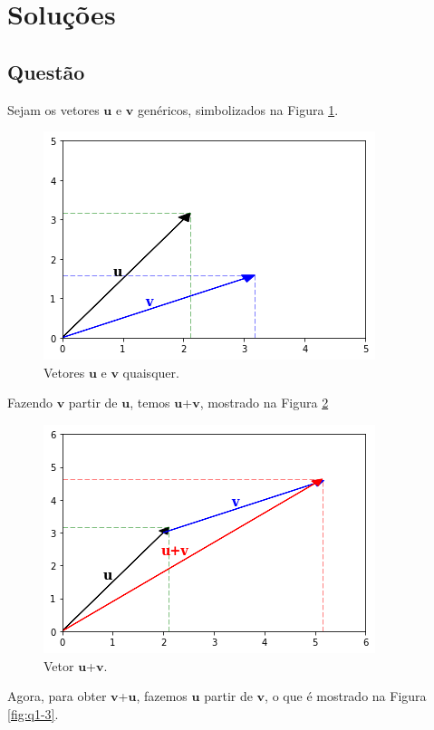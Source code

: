 \documentclass[a4paper,11pt,pagenumber=true]{article}
\newcommand{\vecu}{$\mathbf{u}$}
\newcommand{\vecv}{$\mathbf{v}$}
\theoremstyle{mytheor}
\begin{document}
    \newpage
    
    \section{Soluções}
    
        \subsection{Questão }
            
            Sejam os vetores \vecu{} e \vecv{} genéricos, simbolizados na Figura \ref{fig:q1-1}.

            \begin{figure}[h]
            \centering
                \includegraphics[width=.5\textwidth]{images/q1-1.png}
                \caption{Vetores \vecu{} e \vecv{} quaisquer.}
                \label{fig:q1-1}    
            \end{figure}
            
            Fazendo \vecv{} partir de \vecu, temos \vecu+\vecv, mostrado na Figura \ref{fig:q1-2}
            
            \begin{figure}[h]
            \centering
               \includegraphics[width=.5\textwidth]{images/q1-2.png}
                \caption{Vetor \vecu+\vecv.}
                \label{fig:q1-2}    
            \end{figure}
            
            Agora, para obter \vecv+\vecu, fazemos \vecu{} partir de \vecv, o que é mostrado na Figura \ref{fig:q1-3}.
        
\end{document}
